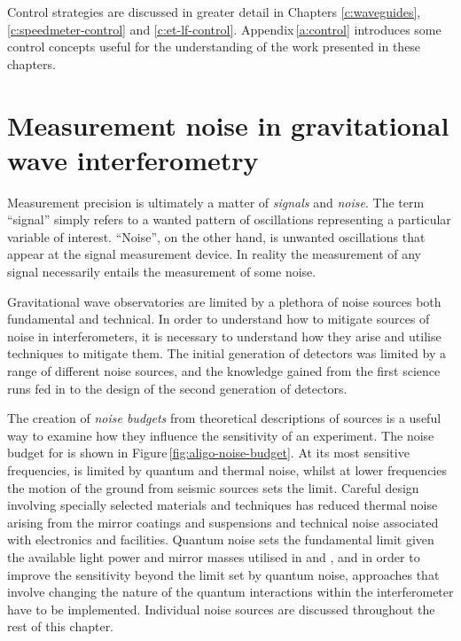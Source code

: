 Control strategies are discussed in greater detail in Chapters \ref{c:waveguides}, \ref{c:speedmeter-control} and \ref{c:et-lf-control}. Appendix\,\ref{a:control} introduces some control concepts useful for the understanding of the work presented in these chapters.

\section{\label{sec:ifo-noise}Measurement noise in gravitational wave interferometry}
Measurement precision is ultimately a matter of \emph{signals} and \emph{noise}. The term ``signal'' simply refers to a wanted pattern of oscillations representing a particular variable of interest. ``Noise'', on the other hand, is unwanted oscillations that appear at the signal measurement device. In reality the measurement of any signal necessarily entails the measurement of some noise.

Gravitational wave observatories are limited by a plethora of noise sources both fundamental and technical. In order to understand how to mitigate sources of noise in interferometers, it is necessary to understand how they arise and utilise techniques to mitigate them. The initial generation of detectors was limited by a range of different noise sources, and the knowledge gained from the first science runs fed in to the design of the second generation of detectors.

The creation of \emph{noise budgets} from theoretical descriptions of sources is a useful way to examine how they influence the sensitivity of an experiment. The noise budget for \ALIGO{} is shown in Figure\,\ref{fig:aligo-noise-budget}. At its most sensitive frequencies, \ALIGO{} is limited by quantum and thermal noise, whilst at lower frequencies the motion of the ground from seismic sources sets the limit. Careful design involving specially selected materials and techniques has reduced thermal noise arising from the mirror coatings and suspensions and technical noise associated with electronics and facilities. Quantum noise sets the fundamental limit given the available light power and mirror masses utilised in \ALIGO{} and \AVIRGO{}, and in order to improve the sensitivity beyond the limit set by quantum noise, approaches that involve changing the nature of the quantum interactions within the interferometer have to be implemented. Individual noise sources are discussed throughout the rest of this chapter.

